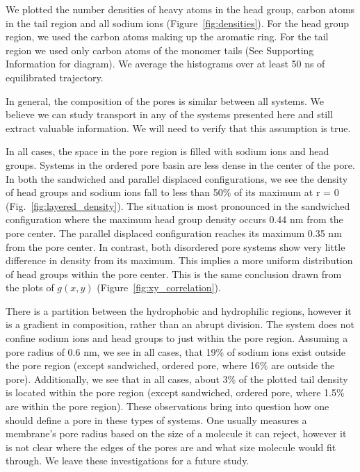\documentclass[journal=jpcbfk,manusciprt=article]{achemso}
\begin{document}
  We plotted the number densities of heavy atoms in the head group, carbon atoms in the tail
  region and all sodium ions (Figure~\ref{fig:densities}). For the head group
  region, we used the carbon atoms making up the aromatic ring. For the tail
  region we used only carbon atoms of the monomer tails (See Supporting
  Information for diagram). We average the histograms over at least 50 ns of
  equilibrated trajectory.
  
  In general, the composition of the pores is similar between all systems. We believe we can
  study transport in any of the systems presented here and still extract valuable information.
  We will need to verify that this assumption is true.  
  
  In all cases, the space in the pore region is filled with sodium ions and
  head groups. Systems in the ordered pore basin are less dense in
  the center of the pore. In both the sandwiched and parallel displaced
  configurations, we see the density of head groups and sodium ions fall to less
  than 50\% of its maximum at r = 0 (Fig.~\ref{fig:layered_density}). The
  situation is most pronounced in the sandwiched configuration where the maximum
  head group density occurs 0.44 nm from the pore center. The parallel displaced
  configuration reaches its maximum 0.35 nm from the pore center. In contrast,
  both disordered pore systems show very little difference in density from its
  maximum. This implies a more uniform distribution of head groups within the
  pore center. This is the same conclusion drawn from the plots of $g(x,y)$ 
  (Figure~\ref{fig:xy_correlation}). 

  There is a partition between the hydrophobic and hydrophilic regions, however
  it is a gradient in composition, rather than an abrupt division. The system
  does not confine sodium ions and head groups to just within the pore region.
  Assuming a pore radius of 0.6 nm, we see in all cases, that 19\% of sodium ions
  exist outside the pore region (except sandwiched, ordered pore, where 16\%
  are outside the pore). Additionally, we see that in all cases, about 3\% of the
  plotted tail density is located within the pore region (except sandwiched,
  ordered pore, where 1.5\% are within the pore region). These observations bring
  into question how one should define a pore in these types of systems. One
  usually measures a membrane's pore radius based on the size of a molecule it
  can reject, however it is not clear where the edges of the pores are and what
  size molecule would fit through. We leave these investigations for a future
  study.
\end{document}
